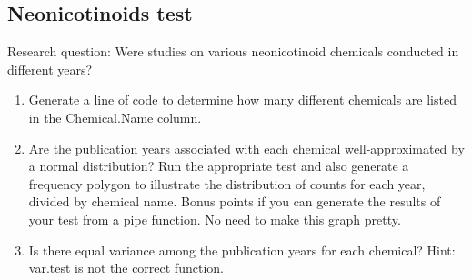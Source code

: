 \documentclass[]{article}
\newenvironment{Shaded}{\begin{snugshade}}{\end{snugshade}}
\newcommand{\KeywordTok}[1]{\textcolor[rgb]{0.13,0.29,0.53}{\textbf{#1}}}
\newcommand{\DataTypeTok}[1]{\textcolor[rgb]{0.13,0.29,0.53}{#1}}
\newcommand{\DecValTok}[1]{\textcolor[rgb]{0.00,0.00,0.81}{#1}}
\newcommand{\FloatTok}[1]{\textcolor[rgb]{0.00,0.00,0.81}{#1}}
\newcommand{\StringTok}[1]{\textcolor[rgb]{0.31,0.60,0.02}{#1}}
\newcommand{\CommentTok}[1]{\textcolor[rgb]{0.56,0.35,0.01}{\textit{#1}}}
\newcommand{\OperatorTok}[1]{\textcolor[rgb]{0.81,0.36,0.00}{\textbf{#1}}}
\newcommand{\NormalTok}[1]{#1}
\begin{document}
\begin{Shaded}
\end{Shaded}

\subsection{Neonicotinoids test}\label{neonicotinoids-test}

Research question: Were studies on various neonicotinoid chemicals
conducted in different years?

\begin{enumerate}
\def\labelenumi{\arabic{enumi}.}
\setcounter{enumi}{2}
\item
  Generate a line of code to determine how many different chemicals are
  listed in the Chemical.Name column.
\item
  Are the publication years associated with each chemical
  well-approximated by a normal distribution? Run the appropriate test
  and also generate a frequency polygon to illustrate the distribution
  of counts for each year, divided by chemical name. Bonus points if you
  can generate the results of your test from a pipe function. No need to
  make this graph pretty.
\item
  Is there equal variance among the publication years for each chemical?
  Hint: var.test is not the correct function.
\end{enumerate}
\end{document}
